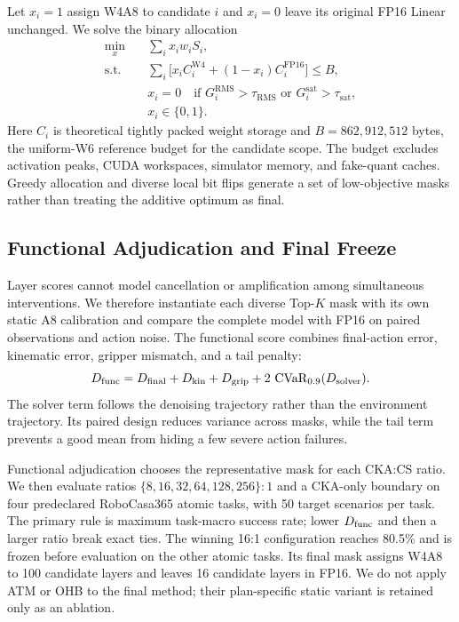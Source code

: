 Let $x_i=1$ assign W4A8 to candidate $i$ and $x_i=0$ leave its original FP16 Linear unchanged. We solve the binary allocation
\begin{align}
\min_{x}\quad &\sum_i x_i w_i S_i, \label{eq:objective}\\
\text{s.t.}\quad &\sum_i \big[x_i C_i^{\mathrm{W4}}+(1-x_i)C_i^{\mathrm{FP16}}\big]\le B,\nonumber\\
&x_i=0\quad\text{if }G_i^{\mathrm{RMS}}>\tau_{\mathrm{RMS}}
                  \text{ or }G_i^{\mathrm{sat}}>\tau_{\mathrm{sat}},\nonumber\\
&x_i\in\{0,1\}.\nonumber
\end{align}
Here $C_i$ is theoretical tightly packed weight storage and $B=862{,}912{,}512$ bytes, the uniform-W6 reference budget for the candidate scope. The budget excludes activation peaks, CUDA workspaces, simulator memory, and fake-quant caches. Greedy allocation and diverse local bit flips generate a set of low-objective masks rather than treating the additive optimum as final.

\subsection{Functional Adjudication and Final Freeze}
\label{sec:adjudication}

Layer scores cannot model cancellation or amplification among simultaneous interventions. We therefore instantiate each diverse Top-$K$ mask with its own static A8 calibration and compare the complete model with FP16 on paired observations and action noise. The functional score combines final-action error, kinematic error, gripper mismatch, and a tail penalty:
\begin{equation}
    D_{\mathrm{func}}=D_{\mathrm{final}}+D_{\mathrm{kin}}+D_{\mathrm{grip}}
           +2\,\operatorname{CVaR}_{0.9}(D_{\mathrm{solver}}).
    \label{eq:dfunc}
\end{equation}
The solver term follows the denoising trajectory rather than the environment trajectory. Its paired design reduces variance across masks, while the tail term prevents a good mean from hiding a few severe action failures.

Functional adjudication chooses the representative mask for each CKA:CS ratio. We then evaluate ratios $\{8,16,32,64,128,256\}:1$ and a CKA-only boundary on four predeclared RoboCasa365 atomic tasks, with 50 target scenarios per task. The primary rule is maximum task-macro success rate; lower $D_{\mathrm{func}}$ and then a larger ratio break exact ties. The winning 16:1 configuration reaches 80.5\% and is frozen before evaluation on the other atomic tasks. Its final mask assigns W4A8 to 100 candidate layers and leaves 16 candidate layers in FP16. We do not apply ATM or OHB to the final method; their plan-specific static variant is retained only as an ablation.
